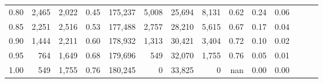 \begin{tabular}{rrrrrrrrrrrrrr}
0.80 &   2,465 &  2,022 &  0.45 &  175,237 &    5,008 &  25,694 &   8,131 &  0.62 &  0.24 &      0.06 \\
0.85 &   2,251 &  2,516 &  0.53 &  177,488 &    2,757 &  28,210 &   5,615 &  0.67 &  0.17 &      0.04 \\
0.90 &   1,444 &  2,211 &  0.60 &  178,932 &    1,313 &  30,421 &   3,404 &  0.72 &  0.10 &      0.02 \\
0.95 &     764 &  1,649 &  0.68 &  179,696 &      549 &  32,070 &   1,755 &  0.76 &  0.05 &      0.01 \\
1.00 &     549 &  1,755 &  0.76 &  180,245 &        0 &  33,825 &       0 &   nan &  0.00 &      0.00 \\
\bottomrule
\end{tabular}
